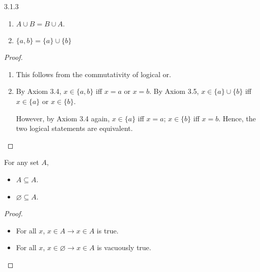 \begin{exercise}{3.1.3}
\begin{enumerate}
	\item $A \cup B = B \cup A$.
	\item $\{a,b\} = \{a\} \cup \{b\}$
\end{enumerate}
\end{exercise}
\begin{proof}\leavevmode
	\begin{enumerate}
		\item This follows from the commutativity of logical or.
		\item By Axiom 3.4, $x \in \{a,b\}$ iff $x = a$ or $x = b$. By Axiom 3.5, $x \in \{a\} \cup \{b\}$ iff $x \in \{a\}$ or $x \in \{b\}$.
		
		However, by Axiom 3.4 again, $x \in \{a\}$ iff $x = a$; $x \in \{b\}$ iff $x = b$. Hence, the two logical statements are equivalent.
	\end{enumerate}
\end{proof}

\begin{why}{32}
	For any set $A$,
	\begin{itemize}
		\item $A \subseteq A$.
		\item $\varnothing \subseteq A$.
	\end{itemize}
\end{why}
\begin{proof}\leavevmode
	\begin{itemize}
		\item For all $x$, $x \in A \to x \in A$ is true.
		\item For all $x$, $x \in \varnothing \to x \in A$ is vacuously true.
	\end{itemize}
\end{proof}

